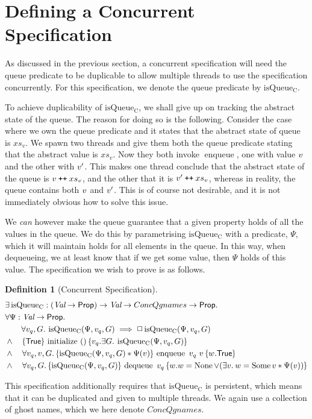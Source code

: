 \documentclass[a4paper, 10pt]{report}
\theoremstyle{definition}
\newtheorem{definition}{Definition}[section]
\newcommand{\initialise}{\operatorname{initialize}}
\newcommand{\enqueue}{\operatorname{enqueue}}
\newcommand{\dequeue}{\operatorname{dequeue}}
\newcommand{\isqueueconc}{\operatorname{isQueue_{C}}}
\newcommand{\ConcQgnames}{ConcQgnames}
\newcommand{\vq}{v_q}
\newcommand{\nodeval}{\valB}
\newcommand{\absvalue}{\val}
\newcommand{\absvalueList}{xs_v}
\newcommand{\Qg}{G}
\newcommand\catenate{\mathbin{\text{\ttfamily\upshape ++}}}
\newcommand{\concspecinitHTGen}[3]{\hoare{\TRUE}{\initialise \ \TT}{#2 . \Exists #3. \isqueueconc(#1, #2, #3)}}
\newcommand{\concspecinitGen}[3]{\concspecinitHTGen{#1}{#2}{#3}}
\newcommand{\concspecinit}[1]{\concspecinitGen{#1}{\vq}{\Qg}}
\newcommand{\concspecenqHT}[4]{\hoare{\isqueueconc(#1, #2, #4) \star{} #1(#3)}{\enqueue \ #2 \ #3}{\valB . \TRUE}}
\newcommand{\concspecenqGen}[4]{\All #2, #3, #4. \concspecenqHT{#1}{#2}{#3}{#4}}
\newcommand{\concspecenq}[1]{\concspecenqGen{#1}{\vq}{\absvalue}{\Qg}}
\newcommand{\concspecdeqHT}[3]{\hoare{\isqueueconc(#1, #2, #3)}{\dequeue \ #2}{\nodeval . \nodeval = \None \lor{} (\Exists \absvalue . \nodeval = \Some \absvalue \star{} #1(\absvalue))}}
\newcommand{\concspecdeqGen}[3]{\All #2, #3. \concspecdeqHT{#1}{#2}{#3}}
\newcommand{\concspecdeq}[1]{\concspecdeqGen{#1}{\vq}{\Qg}}
\begin{document}
\section{Defining a Concurrent Specification}
\label{QueueSpecs:section:conc}

As discussed in the previous section, a concurrent specification will need the queue predicate to be duplicable to allow multiple threads to use the specification concurrently. For this specification, we denote the queue predicate by $\isqueueconc$.

To achieve duplicability of $\isqueueconc$, we shall give up on tracking the abstract state of the queue. The reason for doing so is the following. Consider the case where we own the queue predicate and it states that the abstract state of queue is $\absvalueList$. We spawn two threads and give them both the queue predicate stating that the abstract value is $\absvalueList$. Now they both invoke $\enqueue$, one with value $\absvalue$ and the other with $\absvalue'$. This makes one thread conclude that the abstract state of the queue is $\absvalue \catenate \absvalueList$, and the other that it is $\absvalue' \catenate \absvalueList$, whereas in reality, the queue contains both $\absvalue$ and $\absvalue'$. This is of course not desirable, and it is not immediately obvious how to solve this issue.

We \textit{can} however make the queue guarantee that a given property holds of all the values in the queue. We do this by parametrising $\isqueueconc$ with a predicate, $\Psi$, which it will maintain holds for all elements in the queue. In this way, when dequeueing, we at least know that if we get some value, then $\Psi$ holds of this value. The specification we wish to prove is as follows.
\begin{definition}[Concurrent Specification]\label{QueueSpecs:spec:conc}
\begin{align*}
  &\Exists \isqueueconc : (\Val \to \Prop) \to \Val \to \ConcQgnames \to \Prop.\\
  &\All \Psi : \Val \to \Prop.\\
  &\quad\quad \All \vq, \Qg . \isqueueconc(\Psi, \vq, \Qg) \implies \persistently \isqueueconc(\Psi, \vq, \Qg)\\
  &\land{}\quad\concspecinit{\Psi}\\
  &\land{}\quad\concspecenq{\Psi}\\
  &\land{}\quad\concspecdeq{\Psi}
\end{align*}
\end{definition}
This specification additionally requires that $\isqueueconc$ is persistent, which means that it can be duplicated and given to multiple threads. We again use a collection of ghost names, which we here denote $\ConcQgnames$.
\end{document}
